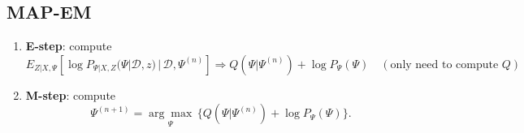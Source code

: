 \documentclass{article}
\newenvironment{topic}[1]{\subsection*{#1}}{}
\newcommand*{\D}{\mathcal{D}}
\begin{document}
\begin{topic}{MAP-EM}
    \begin{enumerate}
        \item \textbf{E-step}: compute
        \[
            E_{Z|X, \Psi}[\log P_{\Psi|X, Z} (\Psi| \D, z)\, | \, \D, \Psi^{(n)}] \Rightarrow Q(\Psi|\Psi^{(n)}) + \log P_{\Psi}(\Psi) \quad (\text{only need to compute }Q)
        \]
        \item \textbf{M-step}: compute
        \[
            \Psi^{(n + 1)} = \underset{\Psi}{\arg \max} \, \{Q(\Psi|\Psi^{(n)}) + \log P_{\Psi}(\Psi)\}.
        \]
    \end{enumerate}
\end{topic}
\end{document}
